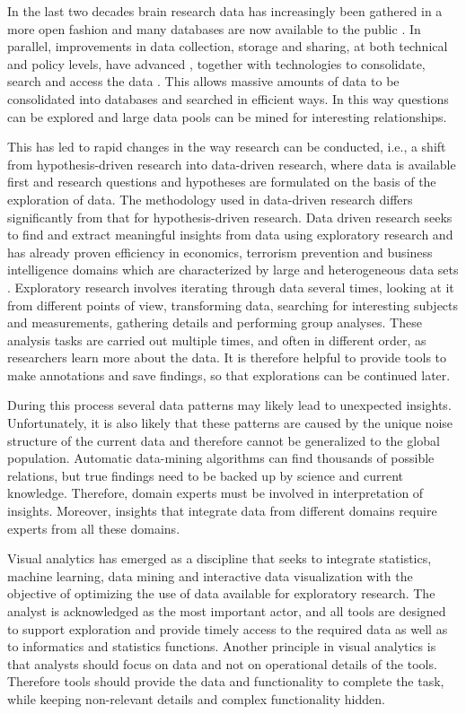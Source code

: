 \documentclass[twocolumn]{svjour3}
\begin{document}
In the last two decades brain research data has increasingly been gathered in a more open fashion and many databases are now available to the public \cite{milham_open_2012}. In parallel, improvements in data collection, storage and sharing, at both technical and policy levels, have advanced \cite{eckersley_neuroscience_2003}, together with technologies to consolidate, search and access the data \cite{van_horn_is_2009,wood_harnessing_2014}. This allows massive amounts of data to be consolidated into databases and searched in efficient ways. In this way questions can be explored and large data pools can be mined for interesting relationships.




This has led to rapid changes in the way research can be conducted, i.e., a shift from hypothesis-driven research into data-driven research, where data is available first and research questions and hypotheses are formulated on the basis of the exploration of data. The methodology used in data-driven research differs significantly from that for hypothesis-driven research. Data driven research seeks to find and extract meaningful insights from data using exploratory research \cite{tukey_we_1980} and has already proven efficiency in economics, terrorism prevention and business intelligence domains which are characterized by large and heterogeneous data sets \cite{cook_illuminating_2005}. Exploratory research involves iterating through data several times, looking at it from different points of view, transforming data, searching for interesting subjects and measurements, gathering details and performing group analyses. These analysis tasks are carried out multiple times, and often in different order, as researchers learn more about the data. It is therefore helpful to provide tools to make annotations and save findings, so that explorations can be continued later.


During this process several data patterns may likely lead to unexpected insights. Unfortunately, it is also likely that these patterns are caused by the unique noise structure of the current data and therefore cannot be generalized to the global population. Automatic data-mining algorithms can find thousands of possible relations, but true findings need to be backed up by science and current knowledge.  Therefore, domain experts must be involved in interpretation of insights. Moreover, insights that integrate data from different domains require experts from all these domains.


Visual analytics \cite{keim_visual_2008} has emerged as a discipline that seeks to integrate statistics, machine learning, data mining and interactive data visualization with the objective of optimizing the use of data available for exploratory research. The analyst is acknowledged as the most important actor, and all tools are designed to support exploration and provide timely access to the required data as well as to informatics and statistics functions. Another principle in visual analytics is that analysts should focus on data and not on operational details of the tools. Therefore tools should provide the data and functionality to complete the task, while keeping non-relevant details and complex functionality hidden.
\end{document}
